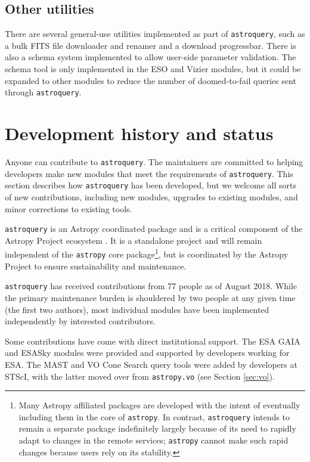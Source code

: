 \documentclass[twocolumn]{aastex62}
\newcommand{\package}[1]{\texttt{#1}\xspace}
\newcommand{\astroquery}{\package{astroquery}}
\newcommand{\astropy}{Astropy\xspace}
\newcommand{\astropypkg}{\package{astropy}}
\begin{document}
\subsection{Other utilities}
There are several general-use utilities implemented as part of \astroquery, such
as a bulk FITS file downloader and renamer and a download progressbar.  There
is also a schema system implemented to allow user-side parameter validation.
The schema tool is only implemented in the ESO and Vizier modules, but it could
be expanded to other modules to reduce the number of doomed-to-fail queries
sent through \astroquery.

\section{Development history and status}
\label{sec:development}
Anyone can contribute to \astroquery.  The maintainers are committed to helping
developers make new modules that meet the requirements of \astroquery.  This
section describes how \astroquery has been developed, but we welcome all sorts
of new contributions, including new modules, upgrades to existing modules, and
minor corrections to existing tools.

\astroquery is an \astropy coordinated package \citep{APE15} and is a critical
component of the \astropy Project ecosystem \citep{Astropy-Collaboration2018}.
It is a standalone project and will remain independent of the \astropypkg core
package\footnote{Many \astropy affiliated packages are developed with the
intent of eventually including them in the core of \astropypkg.  In contrast,
\astroquery intends to remain a separate package indefinitely largely because
of its need to rapidly adapt to changes in the remote services; \astropypkg
cannot make such rapid changes because users rely on its stability.}, but is
coordinated by the \astropy Project to ensure sustainability and maintenance.

\astroquery has received contributions from 77 people as of August 2018.  While the primary maintenance
burden is shouldered by two people at any given time (the first two authors),
most individual modules have been implemented independently by interested
contributors.

Some contributions have come with direct institutional support.  The ESA GAIA and
ESASky modules were provided and supported by developers working for ESA\@.  The
MAST and VO Cone Search query tools were added by developers at STScI, with the
latter moved over from \texttt{astropy.vo} (see Section \ref{sec:vo}).
\end{document}
